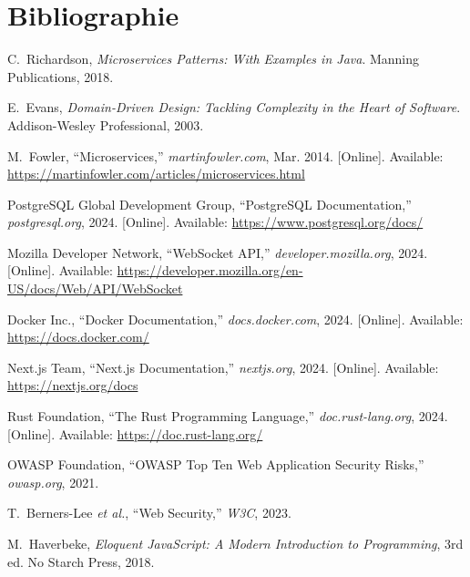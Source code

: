 \documentclass{rapportPfe}
\begin{document}
\newpage


\chapter*{Bibliographie}
\begin{thebibliography}{10}

C.~Richardson, \textit{Microservices Patterns: With Examples in Java}. Manning Publications, 2018.

E.~Evans, \textit{Domain-Driven Design: Tackling Complexity in the Heart of Software}. Addison-Wesley Professional, 2003.

M.~Fowler, ``Microservices,'' \textit{martinfowler.com}, Mar. 2014. [Online]. Available: \url{https://martinfowler.com/articles/microservices.html}

PostgreSQL Global Development Group, ``PostgreSQL Documentation,'' \textit{postgresql.org}, 2024. [Online]. Available: \url{https://www.postgresql.org/docs/}

Mozilla Developer Network, ``WebSocket API,'' \textit{developer.mozilla.org}, 2024. [Online]. Available: \url{https://developer.mozilla.org/en-US/docs/Web/API/WebSocket}

Docker Inc., ``Docker Documentation,'' \textit{docs.docker.com}, 2024. [Online]. Available: \url{https://docs.docker.com/}

Next.js Team, ``Next.js Documentation,'' \textit{nextjs.org}, 2024. [Online]. Available: \url{https://nextjs.org/docs}

Rust Foundation, ``The Rust Programming Language,'' \textit{doc.rust-lang.org}, 2024. [Online]. Available: \url{https://doc.rust-lang.org/}

OWASP Foundation, ``OWASP Top Ten Web Application Security Risks,'' \textit{owasp.org}, 2021.

T.~Berners-Lee \textit{et al.}, ``Web Security,'' \textit{W3C}, 2023.

M.~Haverbeke, \textit{Eloquent JavaScript: A Modern Introduction to Programming}, 3rd ed. No Starch Press, 2018.

\end{thebibliography}
\end{document}
